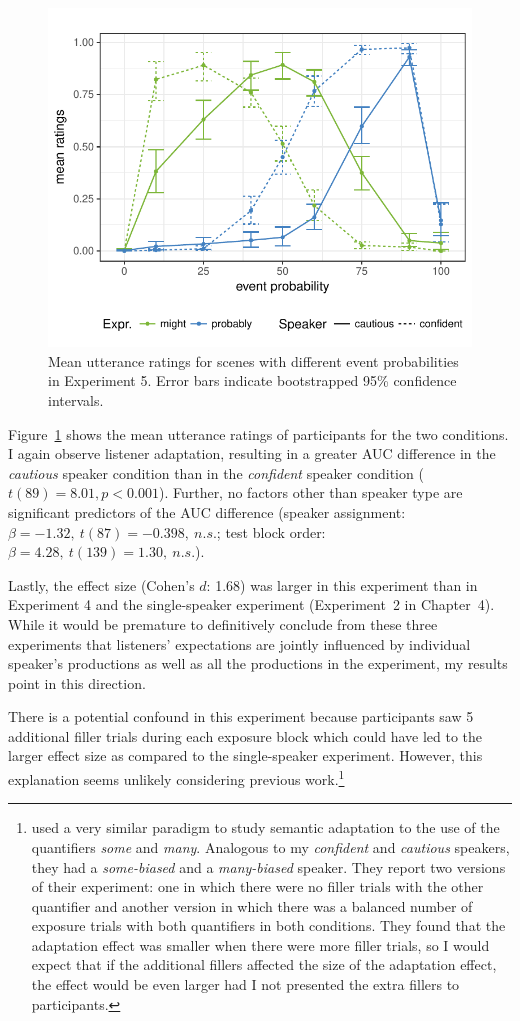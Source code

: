 \begin{figure}
\center
\includegraphics[width=0.5\columnwidth]{plots/exp2-results.pdf}
\caption{Mean utterance ratings for scenes with different event probabilities in Experiment 5. Error bars indicate bootstrapped 95\% confidence intervals. \label{fig:exp2-results}}
\end{figure}

Figure~\ref{fig:exp2-results} shows the mean utterance ratings of participants for the two conditions. I again observe listener adaptation, resulting in a greater AUC difference in the \emph{cautious} speaker 
condition than in the \emph{confident} speaker condition ($t(89)=8.01, p < 0.001$). Further, no factors
other than speaker type are significant predictors of the AUC difference 
(speaker assignment: $\beta=-1.32, \ t(87)=-0.398, \ n.s.$; test block order:  $\beta=4.28, \ t(139)=1.30, \ n.s.$).

Lastly, the effect size (Cohen's $d$: 1.68) was larger in this experiment than in Experiment 4 and the single-speaker 
experiment (Experiment~2 in Chapter~4). While it would be premature to definitively conclude from these three experiments that listeners' expectations are jointly influenced
by individual speaker's productions as well as all the productions in the experiment, my results point in this direction. 

There is a potential confound in this experiment because participants saw 5 additional filler trials during each exposure block which could have led to the larger effect size as compared
to the single-speaker experiment. However, this explanation seems unlikely considering previous work.\footnote{\textcite{Yildirim2016} used 
a very similar paradigm to study semantic adaptation to the use of the quantifiers \textit{some} and \textit{many}. Analogous to my \textit{confident} and 
\textit{cautious} speakers, they had a \textit{some-biased} and a \textit{many-biased} speaker. They report two versions of their experiment: one in which
there were no filler trials with the other quantifier and another version in which there was a balanced number of exposure trials with both quantifiers in both conditions. They found that the adaptation effect was smaller when there were more filler trials, so I would expect that if the additional fillers affected the size of the adaptation effect, the effect would be even larger had I not presented the extra fillers to participants.}



